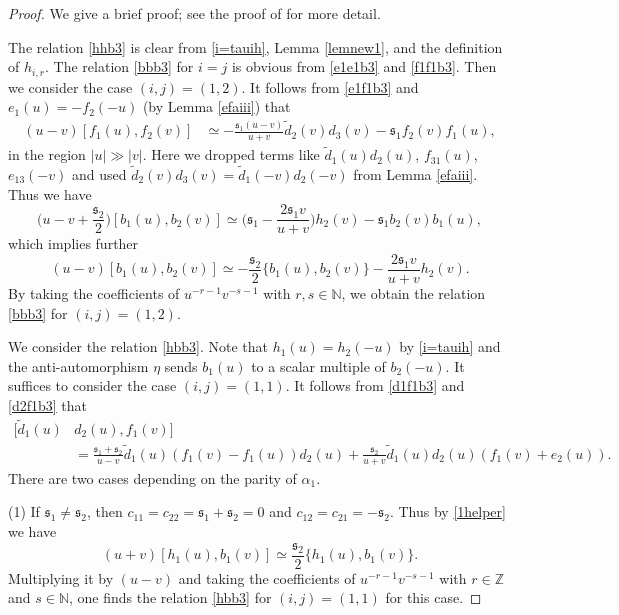 \documentclass[11pt,reqno]{amsart}
\numberwithin{equation}{section}
\theoremstyle{definition}
\theoremstyle{remark}
\newcommand{\beq}{\begin{equation}}
\newcommand{\eeq}{\end{equation}}
\newcommand{\bN}{\mathbb{N}}
\newcommand{\tl}{\tilde}
\newcommand{\ka}{{\mathfrak s}}
\def \Z{\mathbb{Z}}
\begin{document}
\begin{proof}
We give a brief proof; see the proof of \cite[Prop. 7.20]{lu2024drinfeld} for more detail.

The relation \eqref{hhb3} is clear from \eqref{i=tauih}, Lemma \ref{lemnew1}, and the definition of $h_{i,r}$. The relation \eqref{bbb3} for $i=j$ is obvious from \eqref{e1e1b3} and \eqref{f1f1b3}. Then we consider the case $(i,j)=(1,2)$. It follows from \eqref{e1f1b3} and $e_1(u)=-f_2(-u)$ (by Lemma \ref{efaiii}) that
\begin{align*}
(u-v)[f_1(u),f_2(v)]&\simeq -\frac{\ka_1(u-v)}{u+v}\tl d_2(v)d_3(v)-\ka_1f_2(v)f_1(u),
\end{align*}
in the region $|u|\gg |v|$. Here we dropped terms like $\tl d_1(u)d_2(u)$, $f_{31}(u)$, $e_{13}(-v)$ and used $\tl d_2(v)d_3(v)=\tl d_1(-v)d_2(-v)$ from Lemma \ref{efaiii}. Thus we have
\[
\Big(u-v+\frac{\ka_2}{2}\Big)[b_1(u),b_2(v)]\simeq\Big(\ka_1-\frac{2\ka_1v}{u+v}\Big)h_2(v)-\ka_1b_2(v)b_1(u),
\]
which implies further
\[
(u-v)[b_1(u),b_2(v)]\simeq -\frac{\ka_2}{2}\big\{b_1(u),b_2(v)\big\}-\frac{2\ka_1v}{u+v} h_2(v).
\]
By taking the coefficients of $u^{-r-1}v^{-s-1}$ with $r,s\in\bN$, we obtain the relation \eqref{bbb3} for $(i,j)=(1,2)$.

We consider the relation \eqref{hbb3}. Note that $h_1(u)=h_2(-u)$ by \eqref{i=tauih} and the anti-automorphism $\eta$ sends $b_1(u)$ to a scalar multiple of $b_2(-u)$. It suffices to consider the case $(i,j)=(1,1)$. It follows from \eqref{d1f1b3} and \eqref{d2f1b3} that
\beq\label{1helper}
\begin{split}
[\tl d_1(u)&d_2(u),f_1(v)]\\&=\frac{\ka_1+\ka_2}{u-v}\tl d_1(u)(f_1(v)-f_1(u))d_2(u)+\frac{\ka_2}{u+v}\tl d_1(u)d_2(u)(f_1(v)+e_2(u)).    
\end{split}
\eeq
There are two cases depending on the parity of $\alpha_1$. 

(1) If $\ka_1\ne \ka_2$, then $c_{11}=c_{22}=\ka_1+\ka_2=0$ and $c_{12}=c_{21}=-\ka_2$. Thus by \eqref{1helper} we have
\[
(u+v)[h_1(u),b_1(v)]\simeq\frac{\ka_2}{2}\{h_1(u),b_1(v)\}.
\]
Multiplying it by $(u-v)$ and taking the coefficients of $u^{-r-1}v^{-s-1}$ with $r\in\Z$ and $s\in\bN$, one finds the relation \eqref{hbb3} for $(i,j)=(1,1)$ for this case.


\end{proof}
\end{document}
